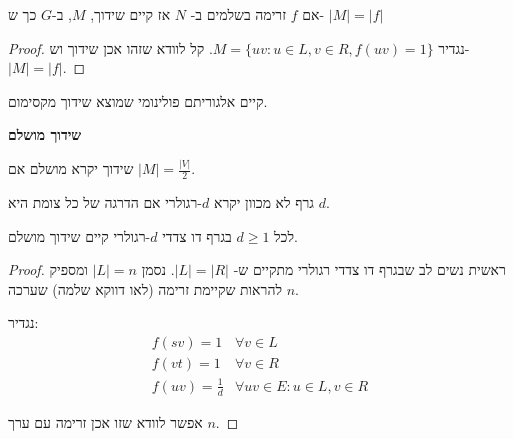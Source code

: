 \begin{claim}
אם $f$ זרימה בשלמים ב-%
$N$
אז קיים שידוך, $M$, ב-$G$ כך ש-%
$|M| = |f|$
\end{claim}

\begin{proof}
נגדיר
$M = \{uv : u \in L, v \in R, f(uv) = 1\}$.
קל לוודא שזהו אכן שידוך וש-%
$|M| = |f|$.
\end{proof}

\begin{corollary}
קיים אלגוריתם פולינומי שמוצא שידוך מקסימום.
\end{corollary}

\textbf{שידוך מושלם}

\begin{definition}
שידוך יקרא מושלם אם 
$|M| = \frac{|V|}{2}$.
\end{definition}

\begin{definition}
גרף לא מכוון יקרא $d$-רגולרי אם הדרגה של כל צומת היא $d$.
\end{definition}

\begin{claim}
לכל 
$d \geq 1$
בגרף דו צדדי $d$-רגולרי קיים שידוך מושלם.
\end{claim}

\begin{proof}
ראשית נשים לב שבגרף דו צדדי רגולרי מתקיים ש-%
$|L| = |R|$.
נסמן 
$|L| = n$
ומספיק להראות שקיימת זרימה (לאו דווקא שלמה) שערכה
$n$.

נגדיר:
$$
\begin{array}{ll}
f(sv) = 1 & \forall v \in L
\\
f(vt) = 1 & \forall v \in R
\\
f(uv) = \frac{1}{d} & \forall uv \in E : u \in L, v \in R
\end{array}
$$

אפשר לוודא שזו אכן זרימה עם ערך $n$.
\end{proof}

